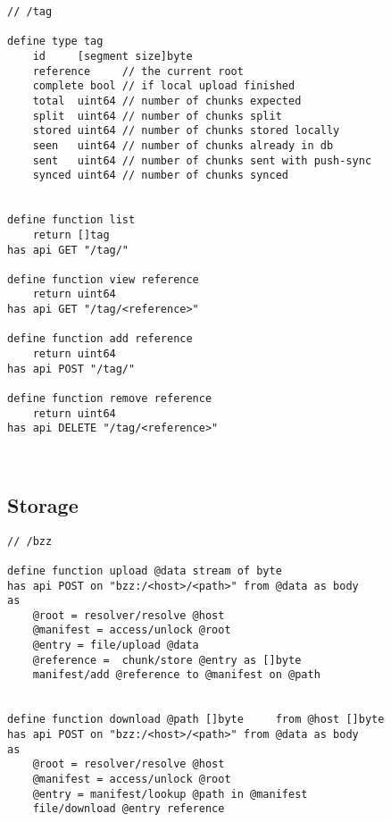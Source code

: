 \begin{definition}[Tags]\label{def:tags}
\begin{lstlisting}[language=buzz1]
// /tag

define type tag
    id     [segment size]byte
    reference     // the current root
    complete bool // if local upload finished
    total  uint64 // number of chunks expected
    split  uint64 // number of chunks split
    stored uint64 // number of chunks stored locally
    seen   uint64 // number of chunks already in db
    sent   uint64 // number of chunks sent with push-sync
    synced uint64 // number of chunks synced


define function list
    return []tag
has api GET "/tag/"

define function view reference
    return uint64
has api GET "/tag/<reference>"
    
define function add reference
    return uint64
has api POST "/tag/"

define function remove reference
    return uint64
has api DELETE "/tag/<reference>"
    
       
\end{lstlisting}
\end{definition}

\subsection{Storage}\label{spec:format:bzz-api}


\begin{definition}\label{def:bzz}
\begin{lstlisting}[language=buzz1]
// /bzz

define function upload @data stream of byte
has api POST on "bzz:/<host>/<path>" from @data as body
as
    @root = resolver/resolve @host
    @manifest = access/unlock @root
    @entry = file/upload @data
    @reference =  chunk/store @entry as []byte
    manifest/add @reference to @manifest on @path


define function download @path []byte     from @host []byte
has api POST on "bzz:/<host>/<path>" from @data as body
as
    @root = resolver/resolve @host
    @manifest = access/unlock @root
    @entry = manifest/lookup @path in @manifest
    file/download @entry reference
\end{lstlisting}
\end{definition}
